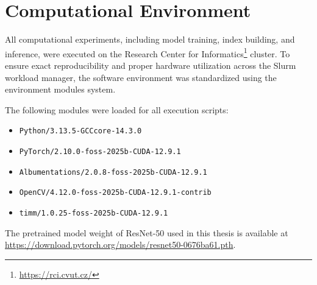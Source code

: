 \chapter{Computational Environment}\label{app:B}
All computational experiments, including model training, index building, and inference, were executed on the Research Center for Informatics\footnote{\url{https://rci.cvut.cz/}} cluster. To ensure exact reproducibility and proper hardware utilization across the Slurm workload manager, the software environment was standardized using the environment modules system.

The following modules were loaded for all execution scripts:
\begin{itemize}
    \item \texttt{Python/3.13.5-GCCcore-14.3.0}
    \item \texttt{PyTorch/2.10.0-foss-2025b-CUDA-12.9.1}
    \item \texttt{Albumentations/2.0.8-foss-2025b-CUDA-12.9.1}
    \item \texttt{OpenCV/4.12.0-foss-2025b-CUDA-12.9.1-contrib}
    \item \texttt{timm/1.0.25-foss-2025b-CUDA-12.9.1}
\end{itemize}

The pretrained model weight of \ac{ResNet}-50 used in this thesis is available at \url{https://download.pytorch.org/models/resnet50-0676ba61.pth}.
